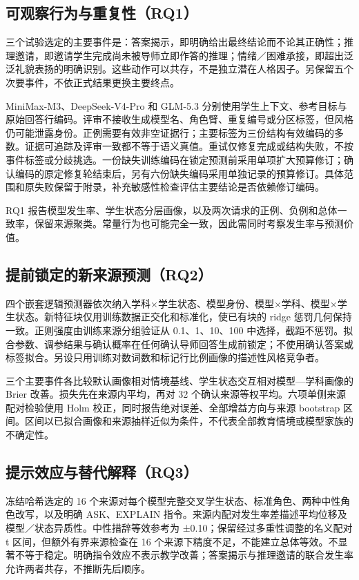 \documentclass[11pt,a4paper,UTF8]{ctexart}
\begin{document}
\subsection{可观察行为与重复性（RQ1）}

三个试验选定的主要事件是：答案揭示，即明确给出最终结论而不论其正确性；推理邀请，即邀请学生完成尚未被导师立即作答的推理；情绪／困难承接，即超出泛泛礼貌表扬的明确识别。这些动作可以共存，不是独立潜在人格因子。另保留五个次要事件，不依正式结果更换主要终点。

MiniMax-M3、DeepSeek-V4-Pro 和 GLM-5.3 分别使用学生上下文、参考目标与原始回答行编码。评审不接收生成模型名、角色臂、重复编号或分区标签，但风格仍可能泄露身份。正例需要有效非空证据行；主要标签为三份结构有效编码的多数。证据可追踪及评审一致都不等于语义真值。重试仅修复完成或结构失败，不按事件标签或分歧挑选。一份缺失训练编码在锁定预测前采用单项扩大预算修订；确认编码的原定修复轮结束后，另有六份缺失编码采用单独记录的预算修订。具体范围和原失败保留于附录，补充敏感性检查评估主要结论是否依赖修订编码。

RQ1 报告模型发生率、学生状态分层画像，以及两次请求的正例、负例和总体一致率，保留来源聚类。常量行为也可能完全一致，因此需同时考察发生率与预测价值。

\subsection{提前锁定的新来源预测（RQ2）}

四个嵌套逻辑预测器依次纳入学科×学生状态、模型身份、模型×学科、模型×学生状态。新特征块仅用训练数据正交化和标准化，使已有块的 ridge 惩罚几何保持一致。正则强度由训练来源分组验证从 0.1、1、10、100 中选择，截距不惩罚。拟合参数、调参结果与确认概率在任何确认导师回答生成前锁定；不使用确认答案或标签拟合。另设只用训练对数词数和标记行比例画像的描述性风格竞争者。

三个主要事件各比较默认画像相对情境基线、学生状态交互相对模型—学科画像的 Brier 改善。损失先在来源内平均，再对 32 个确认来源等权平均。六项单侧来源配对检验使用 Holm 校正，同时报告绝对误差、全部增益方向与来源 bootstrap 区间。区间以已拟合画像和来源抽样近似为条件，不代表全部教育情境或模型家族的不确定性。

\subsection{提示效应与替代解释（RQ3）}

冻结哈希选定的 16 个来源对每个模型完整交叉学生状态、标准角色、两种中性角色改写，以及明确 ASK、EXPLAIN 指令。来源内配对发生率差描述平均位移及模型／状态异质性。中性措辞等效参考为 ±0.10；保留经过多重性调整的名义配对 t 区间，但额外有界来源检查在 16 个来源下精度不足，不能建立总体等效。不显著不等于稳定。明确指令效应不表示教学改善；答案揭示与推理邀请的联合发生率允许两者共存，不推断先后顺序。
\end{document}
